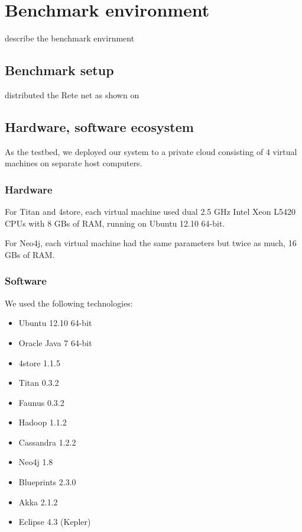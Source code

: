 \section{Benchmark environment}
\label{sec:benchmark-environment}

describe the benchmark envirnment


\subsection{Benchmark setup}


distributed the Rete net as shown on 


\subsection{Hardware, software ecosystem}

As the testbed, we deployed our system to a private cloud consisting of 4 virtual machines on separate host computers. 

\subsubsection{Hardware}
 
For Titan and 4store, each virtual machine used dual 2.5 GHz Intel Xeon L5420 CPUs with 8 GBs of RAM, running on Ubuntu 12.10 64-bit.

For Neo4j, each virtual machine had the same parameters but twice as much, 16 GBs of RAM. 

\subsubsection{Software}

We used the following technologies:

\begin{itemize}
  \item Ubuntu 12.10 64-bit
  \item Oracle Java 7 64-bit
  \item 4store 1.1.5
  \item Titan 0.3.2
  \item Faunus 0.3.2
  \item Hadoop 1.1.2
  \item Cassandra 1.2.2
  \item Neo4j 1.8
  \item Blueprints 2.3.0
  \item Akka 2.1.2
  \item Eclipse 4.3 (Kepler)
\end{itemize}

